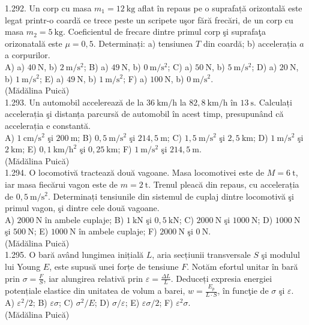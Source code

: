 1.292. Un corp cu masa $m_{1}=12 \mathrm{~kg}$ aflat în repaus pe o suprafață orizontală este legat printr-o coardă ce trece peste un scripete uşor fără frecări, de un corp cu masa $m_{2}=5 \mathrm{~kg}$. Coeficientul de frecare dintre primul corp şi suprafaţa orizonatală este $\mu=0,5$. Determinați: a) tensiunea $T$ din coardă; b) accelerația $a$ a corpurilor.\\ A) a) $40 \mathrm{~N}$, b) $2 \mathrm{~m} / \mathrm{s}^{2}$; B) a) $49 \mathrm{~N}$, b) $0 \mathrm{~m} / \mathrm{s}^{2}$; C) a) $50 \mathrm{~N}$, b) $5 \mathrm{~m} / \mathrm{s}^{2}$; D) a) $20 \mathrm{~N}$, b) $1 \mathrm{~m} / \mathrm{s}^{2}$; E) a) $49 \mathrm{~N}$, b) $1 \mathrm{~m} / \mathrm{s}^{2}$; F) a) $100 \mathrm{~N}$, b) $0 \mathrm{~m} / \mathrm{s}^{2}$.\\ (Mădălina Puică)\\

1.293. Un automobil accelerează de la $36 \mathrm{~km} / \mathrm{h}$ la $82,8 \mathrm{~km} / \mathrm{h}$ în $13 \mathrm{~s}$. Calculați accelerația şi distanța parcursă de automobil în acest timp, presupunând că accelerația e constantă.\\ A) $1 \mathrm{~cm} / \mathrm{s}^{2}$ şi $200 \mathrm{~m}$; B) $0,5 \mathrm{~m} / \mathrm{s}^{2}$ şi $214,5 \mathrm{~m}$; C) $1,5 \mathrm{~m} / \mathrm{s}^{2}$ şi $2,5 \mathrm{~km}$; D) $1 \mathrm{~m} / \mathrm{s}^{2}$ şi $2 \mathrm{~km}$; E) $0,1 \mathrm{~km} / \mathrm{h}^{2}$ şi $0,25 \mathrm{~km}$; F) $1 \mathrm{~m} / \mathrm{s}^{2}$ şi $214,5 \mathrm{~m}$.\\ (Mădălina Puică)\\

1.294. O locomotivă tractează două vagoane. Masa locomotivei este de $M=6 \mathrm{~t}$, iar masa fiecărui vagon este de $m=2 \mathrm{~t}$. Trenul pleacă din repaus, cu accelerația de $0,5 \mathrm{~m} / \mathrm{s}^{2}$. Determinați tensiunile din sistemul de cuplaj dintre locomotivă şi primul vagon, şi dintre cele două vagoane.\\ A) $2000 \mathrm{~N}$ în ambele cuplaje; B) $1 \mathrm{~kN}$ şi $0,5 \mathrm{~kN}$; C) $2000 \mathrm{~N}$ şi $1000 \mathrm{~N}$; D) $1000 \mathrm{~N}$ şi $500 \mathrm{~N}$; E) $1000 \mathrm{~N}$ în ambele cuplaje; F) $2000 \mathrm{~N}$ şi $0 \mathrm{~N}$.\\ (Mădălina Puică)\\

1.295. O bară având lungimea inițială $L$, aria secțiunii transversale $S$ şi modulul lui Young $E$, este supusă unei forțe de tensiune $F$. Notăm efortul unitar în bară prin $\sigma=\frac{F}{S}$, iar alungirea relativă prin $\varepsilon=\frac{\Delta L}{L}$. Deduceți expresia energiei potențiale elastice din unitatea de volum a barei, $w=\frac{E_{p}}{L \cdot S}$, în funcţie de $\sigma$ şi $\varepsilon$.\\ A) $\varepsilon^{2} / 2$; B) $\varepsilon \sigma$; C) $\sigma^{2} / E$; D) $\sigma / \varepsilon$; E) $\varepsilon \sigma / 2$; F) $\varepsilon^{2} \sigma$.\\ (Mădălina Puică)\\

